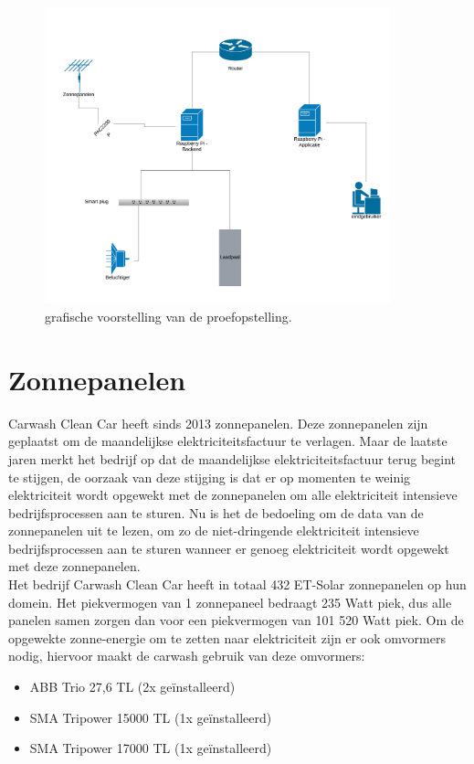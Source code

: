 \begin{figure}[h]
    \includegraphics[width=10cm]{./graphics/Netwerkdiagram-Opstelling.png}
    \caption{grafische voorstelling van de proefopstelling.}
    \label{fig:Netwedrkdiagram-Opstelling}
\end{figure}

\section{Zonnepanelen}
\label{sec:stand-van-zaken-zonnepanelen}

Carwash Clean Car heeft sinds 2013 zonnepanelen. Deze zonnepanelen zijn geplaatst om de maandelijkse elektriciteitsfactuur te verlagen. Maar de laatste jaren merkt het bedrijf op dat de maandelijkse elektriciteitsfactuur terug begint te stijgen, de oorzaak van deze stijging is dat er op momenten te weinig elektriciteit wordt opgewekt met de zonnepanelen om alle elektriciteit intensieve bedrijfsprocessen aan te sturen. Nu is het de bedoeling om de data van de zonnepanelen uit te lezen, om zo de niet-dringende elektriciteit intensieve bedrijfsprocessen aan te sturen wanneer er genoeg elektriciteit wordt opgewekt met deze zonnepanelen.\\

Het bedrijf Carwash Clean Car heeft in totaal 432 ET-Solar zonnepanelen op hun domein. Het piekvermogen van 1 zonnepaneel bedraagt 235 Watt piek, dus alle panelen samen zorgen dan voor een piekvermogen van 101 520 Watt piek. Om de opgewekte zonne-energie om te zetten naar elektriciteit zijn er ook omvormers nodig, hiervoor maakt de carwash gebruik van deze omvormers:

\begin{itemize}
    \item ABB Trio 27,6 TL (2x geïnstalleerd)
    \item SMA Tripower 15000 TL (1x geïnstalleerd)
    \item SMA Tripower 17000 TL (1x geïnstalleerd)
\end{itemize}

